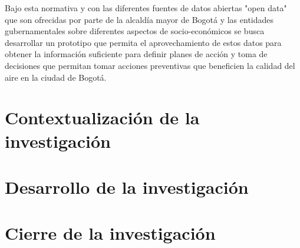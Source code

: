 \documentclass[a4paper, fontsize=16pt, oneside]{book}
\begin{document}
Bajo esta normativa y con las diferentes fuentes de datos abiertas "open data" que son ofrecidas por parte de la alcaldía mayor de Bogotá y las entidades gubernamentales sobre diferentes aspectos de socio-económicos se busca desarrollar un prototipo que permita el aprovechamiento de estos datos para obtener la información suficiente para definir planes de acción y toma de decisiones que permitan tomar acciones preventivas que beneficien la calidad del aire en la ciudad de Bogotá.


\newpage

\part{Contextualización de la investigación}



\part{Desarrollo de la investigación}



\part{Cierre de la investigación}



\newpage

\bibbysection[heading=bibbysubsect]
\end{document}
